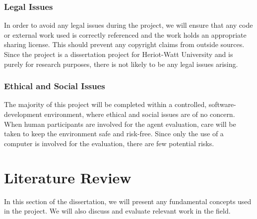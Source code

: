\documentclass[11pt,a4paper]{article}
\begin{document}
\subsubsection{Legal Issues}
In order to avoid any legal issues during the project, we will ensure that any code or external work used is correctly referenced and the work holds an appropriate sharing license. This should prevent any copyright claims from outside sources. Since the project is a dissertation project for Heriot-Watt University and is purely for research purposes, there is not likely to be any legal issues arising.

\subsubsection{Ethical and Social Issues}
The majority of this project will be completed within a controlled, software-development environment, where ethical and social issues are of no concern. When human participants are involved for the agent evaluation, care will be taken to keep the environment safe and risk-free. Since only the use of a computer is involved for the evaluation, there are few potential risks.
\newpage
\section{Literature Review}
In this section of the dissertation, we will present any fundamental concepts used in the project. We will also discuss and evaluate relevant work in the field.
\end{document}
